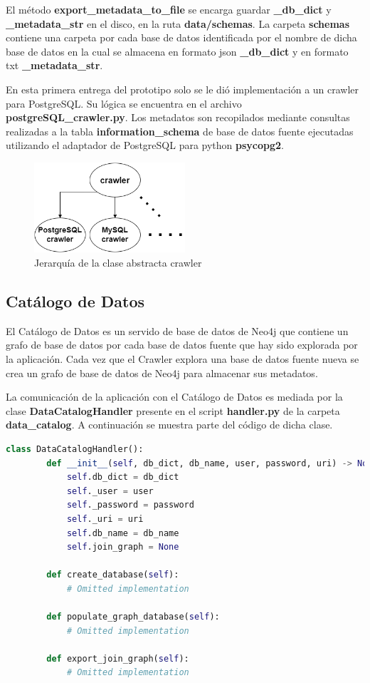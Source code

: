 El método \textbf{export\_metadata\_to\_file} se encarga guardar \textbf{\_db\_dict} y \textbf{\_metadata\_str} en el disco, 
en la ruta \textbf{data/schemas}. La carpeta \textbf{schemas} contiene una carpeta por cada base de datos identificada 
por el nombre de dicha base de datos en la cual se almacena en formato json \textbf{\_db\_dict} y en formato txt 
\textbf{\_metadata\_str}.

En esta primera entrega del prototipo solo se le di\'o implementación a un crawler para PostgreSQL. Su l\'ogica 
se encuentra en el archivo \textbf{postgreSQL\_crawler.py}. Los metadatos son recopilados mediante consultas realizadas
a la tabla \textbf{information\_schema} de base de datos fuente ejecutadas 
utilizando el adaptador de PostgreSQL para python \textbf{psycopg2}.

\begin{figure}[htb]
    \centering
    \includegraphics[width=0.5\textwidth]{Graphics/crawler_class.drawio.png}
    \caption{Jerarquía de la clase abstracta crawler}
    \label{fig:crawler}
\end{figure}


\subsection{Catálogo de Datos}

El Catálogo de Datos es un servido de base de datos de Neo4j que contiene un grafo de base de datos por cada base de datos 
fuente que hay sido explorada por la aplicación. Cada vez que el Crawler explora una base de datos fuente nueva se crea 
un grafo de base de datos de Neo4j para almacenar sus metadatos.

La comunicación de la aplicación con el Catálogo de Datos es mediada por la clase \textbf{DataCatalogHandler} 
presente en el script \textbf{handler.py} de la carpeta \textbf{data\_catalog}. A continuación se muestra parte 
del código de dicha clase.

\begin{lstlisting}[label={code:catalog}, caption={Clase DataCatalogHandler}, language={python}]
    class DataCatalogHandler():
        def __init__(self, db_dict, db_name, user, password, uri) -> None:
            self.db_dict = db_dict
            self._user = user
            self._password = password
            self._uri = uri
            self.db_name = db_name
            self.join_graph = None

        def create_database(self):
            # Omitted implementation

        def populate_graph_database(self):
            # Omitted implementation

        def export_join_graph(self):
            # Omitted implementation

\end{lstlisting}

